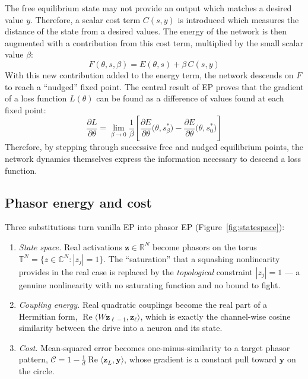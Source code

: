 \documentclass[11pt]{article}
\newcommand{\R}{\mathbb{R}}
\newcommand{\C}{\mathbb{C}}
\newcommand{\T}{\mathbb{T}}
\theoremstyle{definition}
\DeclareMathOperator{\Real}{Re}
\begin{document}
The free equilibrium state may not provide an output which matches a
desired value $y$. Therefore, a scalar cost term $C(s,y)$ is
introduced which measures the distance of the state from a desired
values. The energy of the network is then augmented with a
contribution from this cost term, multiplied by the small scalar
value $\beta$:
\begin{equation}
F(\theta, s, \beta) = E(\theta, s) + \beta\, C(s, y)
\end{equation}
With this new contribution added to the energy term, the network
descends on $F$ to reach a ``nudged'' fixed point. The central
result of EP proves that the gradient of a loss function $L(\theta)$
can be found as a difference of values found at each fixed point:
\begin{equation}
\frac{\partial L}{\partial \theta} = \lim_{\beta \to 0} \frac{1}{\beta}\left[\frac{\partial E}{\partial \theta}\big(\theta, s_\beta^*\big) - \frac{\partial E}{\partial \theta}\big(\theta, s_0^*\big)\right]
\end{equation}
Therefore, by stepping through successive free and nudged equilibrium
points, the network dynamics themselves express the information
necessary to descend a loss function.

\subsection{Phasor energy and cost}
Three substitutions turn vanilla EP into phasor EP (Figure~\ref{fig:statespace}):

\begin{enumerate}[label=(\roman*)]
\item \emph{State space.}  Real activations $\bm{z}\in\R^N$ become
  phasors on the torus $\T^N=\{z\in\C^N:|z_j|=1\}$.  The ``saturation''
  that a squashing nonlinearity provides in the real case is replaced
  by the \emph{topological} constraint $|z_j|=1$ --- a genuine
  nonlinearity with no saturating function and no bound to fight.
\item \emph{Coupling energy.}  Real quadratic couplings become the real
  part of a Hermitian form, $\Real\langle W\bm{z}_{\ell-1},\bm{z}_\ell
  \rangle$, which is exactly the channel-wise cosine similarity between
  the drive into a neuron and its state.
\item \emph{Cost.}  Mean-squared error becomes one-minus-similarity to
  a target phasor pattern, $\mathcal{C}=1-\tfrac1{d}\Real\langle
  \bm{z}_L,\bm{y}\rangle$, whose gradient is a constant pull toward
  $\bm{y}$ on the circle.
\end{enumerate}
\end{document}

